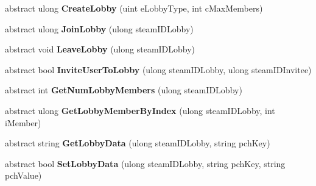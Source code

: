\begin{DoxyCompactItemize}
\item 
\mbox{\label{class_valve_1_1_steamworks_1_1_i_steam_matchmaking_a53fa7cfbec4cabb5b98a67fe932c3ab5}} 
abstract ulong {\bfseries Create\+Lobby} (uint e\+Lobby\+Type, int c\+Max\+Members)
\item 
\mbox{\label{class_valve_1_1_steamworks_1_1_i_steam_matchmaking_aaa8703ea4e40e3a23edd8881f828a455}} 
abstract ulong {\bfseries Join\+Lobby} (ulong steam\+I\+D\+Lobby)
\item 
\mbox{\label{class_valve_1_1_steamworks_1_1_i_steam_matchmaking_aac62c6dfe4a84f9ab54cc3c2b9a84e49}} 
abstract void {\bfseries Leave\+Lobby} (ulong steam\+I\+D\+Lobby)
\item 
\mbox{\label{class_valve_1_1_steamworks_1_1_i_steam_matchmaking_a45facdfabfd56030979e8fbb50b5e6c7}} 
abstract bool {\bfseries Invite\+User\+To\+Lobby} (ulong steam\+I\+D\+Lobby, ulong steam\+I\+D\+Invitee)
\item 
\mbox{\label{class_valve_1_1_steamworks_1_1_i_steam_matchmaking_a71acc626dbe4ecf812fdbe6c47b9cdc7}} 
abstract int {\bfseries Get\+Num\+Lobby\+Members} (ulong steam\+I\+D\+Lobby)
\item 
\mbox{\label{class_valve_1_1_steamworks_1_1_i_steam_matchmaking_a9b258de9592d2a3911c3c83cdb83a4bf}} 
abstract ulong {\bfseries Get\+Lobby\+Member\+By\+Index} (ulong steam\+I\+D\+Lobby, int i\+Member)
\item 
\mbox{\label{class_valve_1_1_steamworks_1_1_i_steam_matchmaking_a7d9a66e6f55a1792d741f1444fb901c4}} 
abstract string {\bfseries Get\+Lobby\+Data} (ulong steam\+I\+D\+Lobby, string pch\+Key)
\item 
\mbox{\label{class_valve_1_1_steamworks_1_1_i_steam_matchmaking_aadce862e0242b1738d45bed4749bf2f8}} 
abstract bool {\bfseries Set\+Lobby\+Data} (ulong steam\+I\+D\+Lobby, string pch\+Key, string pch\+Value)

\end{DoxyCompactItemize}
